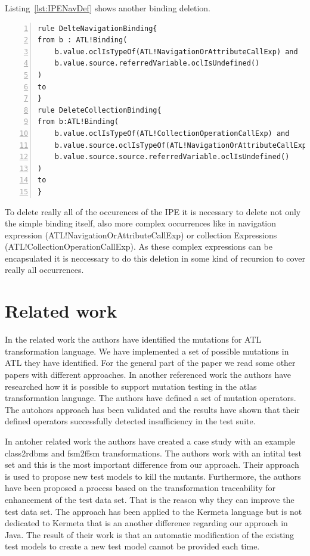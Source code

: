 \documentclass{llncs}
\begin{document}
Listing~\ref{lst:IPENavDef} shows another binding deletion.

\begin{lstlisting}[language=ATL, numbers=left,xleftmargin=5.0ex,label=lst:IPENavDef,caption=Delete bindings after deleting an IPE]
rule DelteNavigationBinding{
from b : ATL!Binding(
	b.value.oclIsTypeOf(ATL!NavigationOrAttributeCallExp) and 
	b.value.source.referredVariable.oclIsUndefined()
)
to
}
rule DeleteCollectionBinding{
from b:ATL!Binding(		
	b.value.oclIsTypeOf(ATL!CollectionOperationCallExp) and 
	b.value.source.oclIsTypeOf(ATL!NavigationOrAttributeCallExp) and 
	b.value.source.source.referredVariable.oclIsUndefined()
)
to
}
\end{lstlisting}

To delete really all of the occurences of the IPE it is necessary to delete not only the simple binding itself, also more complex occurrences like in navigation expression (ATL!NavigationOrAttributeCallExp) or collection Expressions (ATL!CollectionOperationCallExp).
As these complex expressions can be encapsulated it is neccessary to do this deletion in some kind of recursion to cover really all occurrences.

\section{Related work}
In the related work \cite{troya:2015} the authors have identified the mutations
for ATL transformation language. We have implemented a set of possible mutations in ATL they have identified. For the general part of the paper we read some other papers with different approaches.
In another referenced work \cite{book:KhanHassine} the authors have researched
how it is possible to support mutation testing in the atlas transformation
language. The authors have defined a set of mutation operators. The autohors approach has been validated and the results have shown that their
defined operators successfully detected insufficiency in the test suite.

In antoher related work \cite{Aranega:2014} the authors have created a case study with an example class2rdbms and fsm2ffsm transformations. The authors work with an intital test set and this is the most important difference from our approach. Their approach is used to propose new test models to kill the mutants. Furthermore, the authors have been proposed a process based on the transformation traceability for enhancement of the test data set. That is the reason why they can improve the test data set. The approach has been applied to the Kermeta language but is not dedicated to Kermeta that is an another difference regarding our approach in Java. The result of their work is that an automatic modification of the existing test models to create a new test model
cannot be provided each time.
\end{document}
